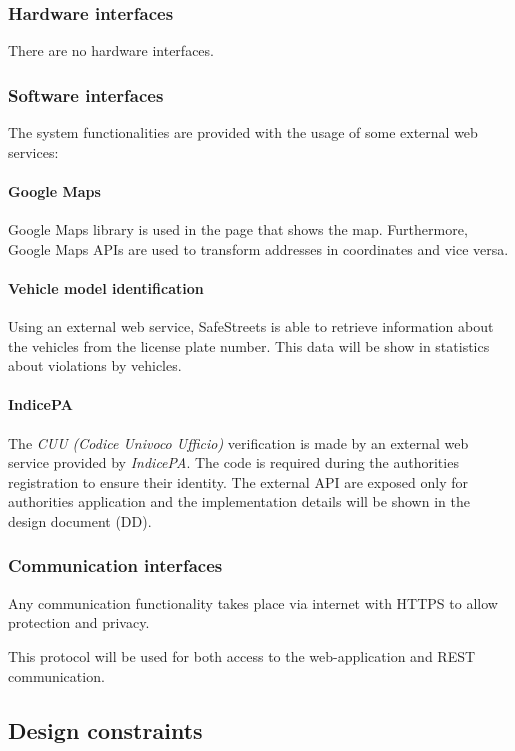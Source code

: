 \subsubsection{Hardware interfaces}
There are no hardware interfaces.

\subsubsection{Software interfaces}
The system functionalities are provided with the usage of some external web services:

\paragraph{Google Maps}
Google Maps library is used in the page that shows the map.
Furthermore, Google Maps APIs are used to transform addresses in coordinates and vice versa.


\paragraph{Vehicle model identification}
Using an external web service, SafeStreets is able to retrieve information about the vehicles from the license plate number.
This data will be show in statistics about violations by vehicles.

\paragraph{IndicePA}
The \textit{CUU (Codice Univoco Ufficio)} verification is made by an external web service provided by \textit{IndicePA}. The code is required during the authorities registration to ensure their identity.
The external API are exposed only for authorities application and the implementation details will be shown in the design document (DD).


\subsubsection{Communication interfaces}
Any communication functionality takes place via internet with HTTPS to allow protection and privacy.

This protocol will be used for both access to the web-application and REST communication.

\subsection{Design constraints}
